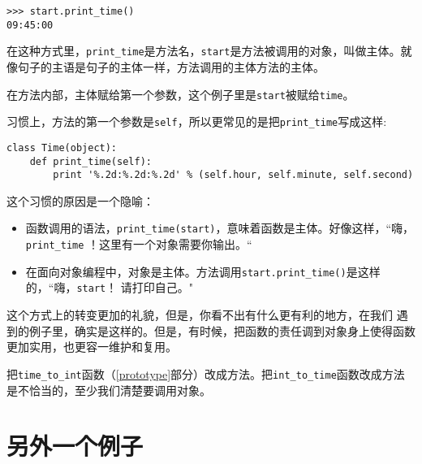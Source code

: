 \beforeverb
\begin{verbatim}
>>> start.print_time()
09:45:00
\end{verbatim}
\afterverb
在这种方式里，\verb"print_time"是方法名，{\tt start}是方法被调用的对象，叫做主体。就像句子的主语是句子的主体一样，方法调用的主体方法的主体。


在方法内部，主体赋给第一个参数，这个例子里是{\tt start}被赋给{\tt time}。


习惯上，方法的第一个参数是{\tt self}，所以更常见的是把\verb"print_time"写成这样:

\beforeverb
\begin{verbatim}
class Time(object):
    def print_time(self):
        print '%.2d:%.2d:%.2d' % (self.hour, self.minute, self.second)
\end{verbatim}
\afterverb
%

这个习惯的原因是一个隐喻：


\begin{itemize}

\item 函数调用的语法，\verb"print_time(start)"，意味着函数是主体。好像这样，“嗨，\verb"print_time" ！这里有一个对象需要你输出。“

\item 在面向对象编程中，对象是主体。方法调用\verb"start.print_time()"是这样的，“嗨，{\tt start}！ 请打印自己。"

\end{itemize}

这个方式上的转变更加的礼貌，但是，你看不出有什么更有利的地方，在我们
遇到的例子里，确实是这样的。但是，有时候，把函数的责任调到对象身上使得函数更加实用，也更容一维护和复用。

\begin{ex}
\label{convert}

把\verb"time_to_int"函数（\ref{prototype}部分）改成方法。把\verb"int_to_time"函数改成方法是不恰当的，至少我们清楚要调用对象。
\end{ex}

\section{另外一个例子}


